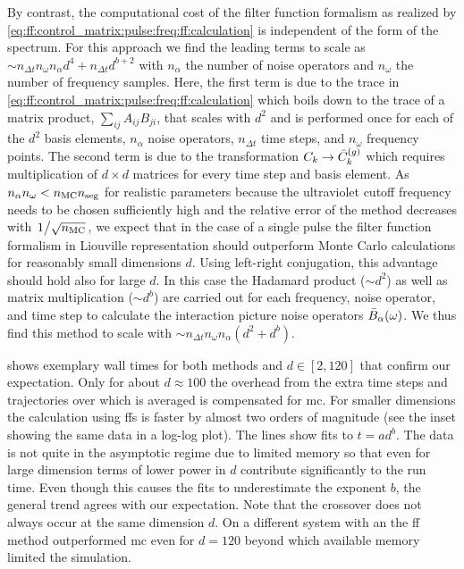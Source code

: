 By contrast, the computational cost of the filter function formalism as realized by \cref{eq:ff:control_matrix:pulse:freq:ff:calculation} is independent of the form of the spectrum.
For this approach we find the leading terms to scale as $\sim n_{\Delta t} n_\omega n_\alpha d^{4} + n_{\Delta t} d^{b+2}$ with $n_\alpha$ the number of noise operators and $n_\omega$ the number of frequency samples.
Here, the first term is due to the trace in \cref{eq:ff:control_matrix:pulse:freq:ff:calculation} which boils down to the trace of a matrix product, $\sum_{ij} A_{ij} B_{ji}$, that scales with $d^2$ and is performed once for each of the $d^2$ basis elements, $n_\alpha$ noise operators, $n_{\Delta t}$ time steps, and $n_\omega$ frequency points.
The second term is due to the transformation $C_k\rightarrow\bar{C}^{(g)}_k$ which requires multiplication of $d\times d$ matrices for every time step and basis element.
As $n_\alpha n_\omega < n_{\mathrm{MC}} n_{\mathrm{seg}}$ for realistic parameters because the ultraviolet cutoff frequency needs to be chosen sufficiently high and the relative error of the method decreases with $\flatfrac{1}{\sqrt{n_\mr{MC}}}$, we expect that in the case of a single pulse the filter function formalism in Liouville representation should outperform Monte Carlo calculations for reasonably small dimensions $d$.
Using left-right conjugation, this advantage should hold also for large $d$.
In this case the Hadamard product ($\sim d^2$) as well as matrix multiplication ($\sim d^b$) are carried out for each frequency, noise operator, and time step to calculate the interaction picture noise operators $\bar{B}_\alpha(\omega)$.
We thus find this method to scale with $\sim n_{\Delta t} n_\omega n_\alpha (d^2 + d^b)$.

 shows exemplary wall times for both methods and $d\in[2,120]$ that confirm our expectation.
Only for about $d\approx\num{100}$ the overhead from the extra time steps and trajectories over which is averaged is compensated for \gls{mc}.
For smaller dimensions the calculation using \glspl{ff} is faster by almost two orders of magnitude (see the inset showing the same data in a log-log plot).
The lines show fits to $t = a d^b$.
The data is not quite in the asymptotic regime due to limited memory so that even for large dimension terms of lower power in $d$ contribute significantly to the run time.
Even though this causes the fits to underestimate the exponent $b$, the general trend agrees with our expectation.
Note that the crossover does not always occur at the same dimension $d$.
On a different system with an \fastprocessor the \gls{ff} method outperformed \gls{mc} even for $d = 120$ beyond which available memory limited the simulation.

